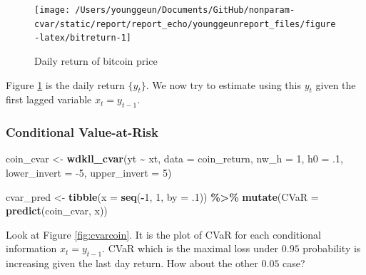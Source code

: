 \documentclass[
]{article}
\newenvironment{Shaded}{\begin{snugshade}}{\end{snugshade}}
\newcommand{\DataTypeTok}[1]{\textcolor[rgb]{0.13,0.29,0.53}{#1}}
\newcommand{\DecValTok}[1]{\textcolor[rgb]{0.00,0.00,0.81}{#1}}
\newcommand{\FloatTok}[1]{\textcolor[rgb]{0.00,0.00,0.81}{#1}}
\newcommand{\KeywordTok}[1]{\textcolor[rgb]{0.13,0.29,0.53}{\textbf{#1}}}
\newcommand{\NormalTok}[1]{#1}
\newcommand{\OperatorTok}[1]{\textcolor[rgb]{0.81,0.36,0.00}{\textbf{#1}}}
\newcommand{\StringTok}[1]{\textcolor[rgb]{0.31,0.60,0.02}{#1}}
\theoremstyle{definition}
\theoremstyle{definition}
\theoremstyle{definition}
\theoremstyle{remark}
\begin{document}
\begin{figure}[H]

{\centering \texttt{[image: /Users/younggeun/Documents/GitHub/nonparam-cvar/static/report/report\_echo/younggeunreport\_files/figure-latex/bitreturn-1]} 

}

\caption{Daily return of bitcoin price}\label{fig:bitreturn}
\end{figure}

Figure \ref{fig:bitreturn} is the daily return \(\{ y_t \}\). We now try to estimate using this \(y_t\) given the first lagged variable \(x_t = y_{t - 1}\).

\hypertarget{conditional-value-at-risk}{%
\subsubsection{Conditional Value-at-Risk}\label{conditional-value-at-risk}}

\begin{Shaded}
\begin{Highlighting}[]
\NormalTok{coin\_cvar <{-}}\StringTok{ }\KeywordTok{wdkll\_cvar}\NormalTok{(yt }\OperatorTok{\textasciitilde{}}\StringTok{ }\NormalTok{xt, }\DataTypeTok{data =}\NormalTok{ coin\_return, }\DataTypeTok{nw\_h =} \DecValTok{1}\NormalTok{, }\DataTypeTok{h0 =} \FloatTok{.1}\NormalTok{, }\DataTypeTok{lower\_invert =} \DecValTok{{-}5}\NormalTok{, }\DataTypeTok{upper\_invert =} \DecValTok{5}\NormalTok{)}
\end{Highlighting}
\end{Shaded}

\begin{Shaded}
\begin{Highlighting}[]
\NormalTok{cvar\_pred <{-}}\StringTok{ }
\StringTok{  }\KeywordTok{tibble}\NormalTok{(}\DataTypeTok{x =} \KeywordTok{seq}\NormalTok{(}\OperatorTok{{-}}\DecValTok{1}\NormalTok{, }\DecValTok{1}\NormalTok{, }\DataTypeTok{by =} \FloatTok{.1}\NormalTok{)) }\OperatorTok{\%>\%}\StringTok{ }
\StringTok{  }\KeywordTok{mutate}\NormalTok{(}\DataTypeTok{CVaR =} \KeywordTok{predict}\NormalTok{(coin\_cvar, x))}
\end{Highlighting}
\end{Shaded}

Look at Figure \ref{fig:cvarcoin}. It is the plot of CVaR for each conditional information \(x_t = y_{t - 1}\). CVaR which is the maximal loss under \(0.95\) probability is increasing given the last day return. How about the other \(0.05\) case?
\end{document}
